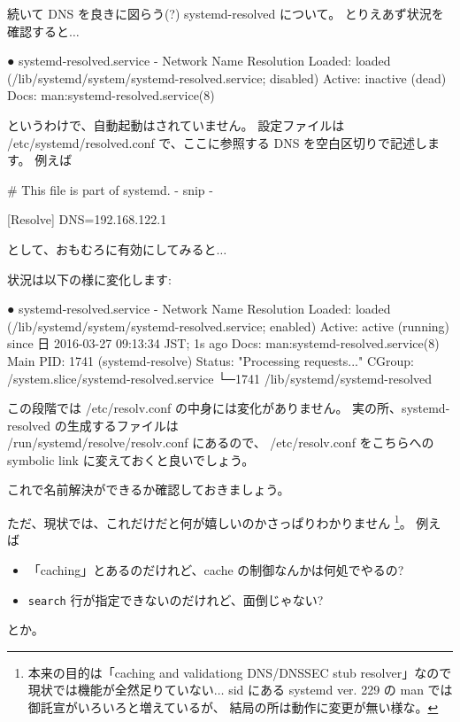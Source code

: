 \documentclass[mingoth,a4paper]{jsarticle}
\begin{document}
続いて DNS を良きに図らう(?) systemd-resolved について。
%
とりえあず状況を確認すると$\dots$
\begin{commandline}
● systemd-resolved.service - Network Name Resolution
   Loaded: loaded (/lib/systemd/system/systemd-resolved.service; disabled)
   Active: inactive (dead)
     Docs: man:systemd-resolved.service(8)
\end{commandline}
\noindent
というわけで、自動起動はされていません。
%
設定ファイルは /etc/systemd/resolved.conf で、ここに参照する DNS を空白区切りで記述します。
例えば
\begin{commandline}
#  This file is part of systemd.
- snip -

[Resolve]
DNS=192.168.122.1
\end{commandline}
\noindent
として、おもむろに有効にしてみると$\dots$
\begin{commandline}
\end{commandline}
\noindent
状況は以下の様に変化します:
\begin{commandline}
● systemd-resolved.service - Network Name Resolution
   Loaded: loaded (/lib/systemd/system/systemd-resolved.service; enabled)
   Active: active (running) since 日 2016-03-27 09:13:34 JST; 1s ago
     Docs: man:systemd-resolved.service(8)
 Main PID: 1741 (systemd-resolve)
   Status: "Processing requests..."
   CGroup: /system.slice/systemd-resolved.service
           └─1741 /lib/systemd/systemd-resolved
\end{commandline}

この段階では /etc/resolv.conf の中身には変化がありません。
実の所、systemd-resolved の生成するファイルは\\
/run/systemd/resolve/resolv.conf にあるので、
/etc/resolv.conf をこちらへの symbolic link に変えておくと良いでしょう。
\begin{commandline}
\end{commandline}
\noindent
これで名前解決ができるか確認しておきましょう。

ただ、現状では、これだけだと何が嬉しいのかさっぱりわかりません%
\footnote{%
  本来の目的は「caching and validationg DNS/DNSSEC stub resolver」なので%
  現状では機能が全然足りていない$\dots$
  sid にある systemd ver. 229 の man では御託宣がいろいろと増えているが、
  結局の所は動作に変更が無い様な。
}。
例えば
\begin{itemize}
\item %
  「caching」とあるのだけれど、cache の制御なんかは何処でやるの?
\item %
  \verb|search| 行が指定できないのだけれど、面倒じゃない?
\end{itemize}
とか。
\end{document}
